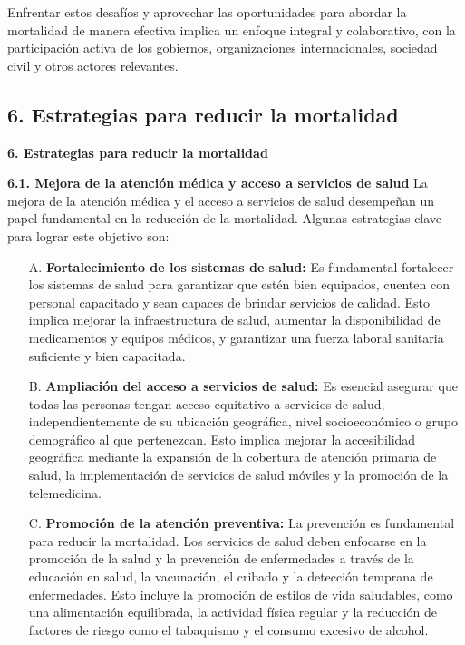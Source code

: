 \documentclass[8pt,a4paper]{beamer}
\begin{document}
{\begin{frame}{}
\begin{block}{}
\begin{enumerate}
\end{enumerate}
Enfrentar estos desafíos y aprovechar las oportunidades para abordar la mortalidad de manera efectiva implica un enfoque integral y colaborativo, con la participación activa de los gobiernos, organizaciones internacionales, sociedad civil y otros actores relevantes.
\end{block}
\end{frame}

\subsection{6. Estrategias para reducir la mortalidad}
\begin{frame}{\textbf{6. Estrategias para reducir la mortalidad}}
\begin{block}{\textbf{6.1. Mejora de la atención médica y acceso a servicios de salud}}
\setlength{\parskip}{3px}
\justifying
La mejora de la atención médica y el acceso a servicios de salud desempeñan un papel fundamental en la reducción de la mortalidad. Algunas estrategias clave para lograr este objetivo son:
\begin{enumerate}
\setlength{\parskip}{3px}
\justifying
\item[A.] \textbf{Fortalecimiento de los sistemas de salud:} Es fundamental fortalecer los sistemas de salud para garantizar que estén bien equipados, cuenten con personal capacitado y sean capaces de brindar servicios de calidad. Esto implica mejorar la infraestructura de salud, aumentar la disponibilidad de medicamentos y equipos médicos, y garantizar una fuerza laboral sanitaria suficiente y bien capacitada.

\item[B.] \textbf{Ampliación del acceso a servicios de salud:} Es esencial asegurar que todas las personas tengan acceso equitativo a servicios de salud, independientemente de su ubicación geográfica, nivel socioeconómico o grupo demográfico al que pertenezcan. Esto implica mejorar la accesibilidad geográfica mediante la expansión de la cobertura de atención primaria de salud, la implementación de servicios de salud móviles y la promoción de la telemedicina.
\end{enumerate}
\end{block}
\end{frame}

\begin{frame}{}
\begin{block}{}
\setlength{\parskip}{3px}
\justifying
\begin{enumerate}
\setlength{\parskip}{3px}
\justifying
\item[C.] \textbf{Promoción de la atención preventiva:} La prevención es fundamental para reducir la mortalidad. Los servicios de salud deben enfocarse en la promoción de la salud y la prevención de enfermedades a través de la educación en salud, la vacunación, el cribado y la detección temprana de enfermedades. Esto incluye la promoción de estilos de vida saludables, como una alimentación equilibrada, la actividad física regular y la reducción de factores de riesgo como el tabaquismo y el consumo excesivo de alcohol.


\end{enumerate}
\end{block}
\end{frame}}
\end{document}
